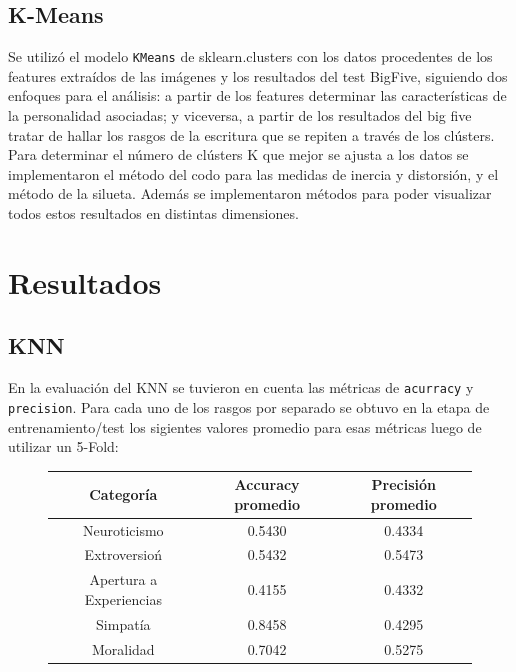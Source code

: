 \documentclass[10pt, a4paper]{article}
\begin{document}
       \subsection{K-Means}
			Se utiliz\'o el modelo \texttt{KMeans} de sklearn.clusters con los datos procedentes de los features extra\'idos de las im\'agenes y los resultados del test BigFive, siguiendo dos enfoques para el an\'alisis: a partir de los features determinar las caracter\'isticas de la personalidad asociadas; y viceversa, a partir de los resultados del big five tratar de hallar los rasgos de la escritura que se repiten a trav\'es de los cl\'usters. Para determinar el n\'umero de cl\'usters K que mejor se ajusta a los datos se implementaron el m\'etodo del codo para las medidas de inercia y distorsi\'on, y el m\'etodo de la silueta. Adem\'as se implementaron m\'etodos para poder visualizar todos estos resultados en distintas dimensiones. 
			
    \section{Resultados}
            \subsection{KNN}
                En la evaluaci\'on del KNN se tuvieron en cuenta las m\'etricas de \texttt{acurracy} y \texttt{precision}. Para cada uno de los rasgos por separado se
                obtuvo en la etapa de entrenamiento/test los sigientes valores promedio para esas m\'etricas luego de utilizar un 5-Fold: \\

                \begin{figure}[H]
                    \centering
                    \begin{tabular}{|c|c|c|}

                        \hline Categor\'ia & Accuracy promedio & Precisi\'on promedio \\  
                        \hline Neuroticismo & 0.5430 & 0.4334 \\
                        \hline Extroversio\'n& 0.5432& 0.5473 \\
                        \hline Apertura a Experiencias & 0.4155 & 0.4332 \\
                        \hline Simpat\'ia& 0.8458 & 0.4295 \\
                        \hline Moralidad & 0.7042 & 0.5275 \\
                        \hline
                    \end{tabular}
                \end{figure}
                
\end{document}
